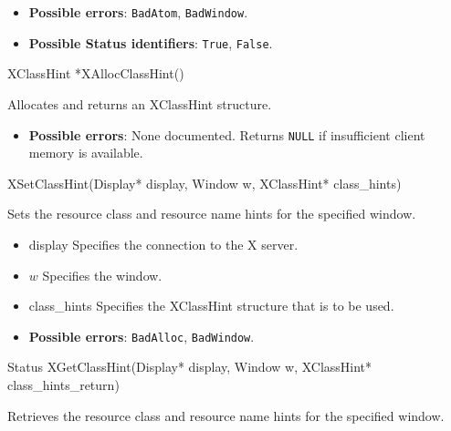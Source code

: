 \documentclass{report}
\begin{document}
\begin{itemize}
            \begin{itemize}
                \item \textbf{Possible errors}: \texttt{BadAtom}, \texttt{BadWindow}.
                \item \textbf{Possible Status identifiers}: \texttt{True}, \texttt{False}.
            \end{itemize}

            \begin{cppcode}
            XClassHint *XAllocClassHint()
            \end{cppcode}
            \bigbreak \noindent
            Allocates and returns an XClassHint structure.

            \begin{itemize}
                \item \textbf{Possible errors}: None documented. Returns \texttt{NULL} if insufficient client memory is available.
            \end{itemize}

            \begin{cppcode}
            XSetClassHint(Display* display, Window w, XClassHint* class_hints)
            \end{cppcode}
            \bigbreak \noindent
            Sets the resource class and resource name hints for the specified window.

            \begin{itemize}
                \item display Specifies the connection to the X server.
                \item $w$ Specifies the window.
                \item class\_hints Specifies the XClassHint structure that is to be used.
            \end{itemize}

            \begin{itemize}
                \item \textbf{Possible errors}: \texttt{BadAlloc}, \texttt{BadWindow}.
            \end{itemize}

            \begin{cppcode}
            Status XGetClassHint(Display* display, Window w, XClassHint* class_hints_return)
            \end{cppcode}
            \bigbreak \noindent
            Retrieves the resource class and resource name hints for the specified window.


\end{itemize}
\end{document}
